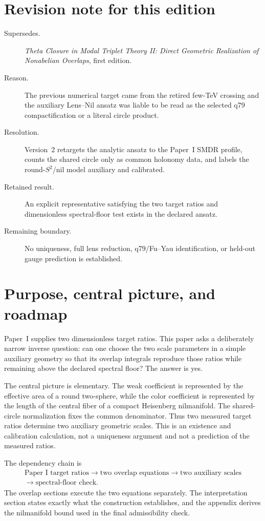 \documentclass[11pt]{article}
\begin{document}
\section*{Revision note for this edition}
\begin{description}
\item[Supersedes.] \emph{Theta Closure in Modal Triplet Theory II: Direct
Geometric Realization of Nonabelian Overlaps}, first edition.
\item[Reason.] The previous numerical target came from the retired few-TeV
crossing and the auxiliary Lens--Nil ansatz was liable to be read as the
selected q79 compactification or a literal circle product.
\item[Resolution.] Version~2 retargets the analytic ansatz to the Paper~I
SMDR profile, counts the shared circle only as common holonomy data, and labels
the round-$S^2$/nil model auxiliary and calibrated.
\item[Retained result.] An explicit representative satisfying the two target
ratios and dimensionless spectral-floor test exists in the declared ansatz.
\item[Remaining boundary.] No uniqueness, full lens reduction, q79/Fu--Yau
identification, or held-out gauge prediction is established.
\end{description}

\section{Purpose, central picture, and roadmap}

Paper~I supplies two dimensionless target ratios. This paper asks a deliberately
narrow inverse question: can one choose the two scale parameters in a simple
auxiliary geometry so that its overlap integrals reproduce those ratios while
remaining above the declared spectral floor? The answer is yes.

The central picture is elementary. The weak coefficient is
represented by the effective area of a round two-sphere, while the color
coefficient is represented by the length of the central fiber of a compact
Heisenberg nilmanifold. The shared-circle normalization fixes the common
denominator. Thus two measured target ratios determine two auxiliary geometric
scales. This is an existence and calibration calculation, not a uniqueness
argument and not a prediction of the measured ratios.

The dependency chain is
\[
\begin{gathered}
\text{Paper~I target ratios}
\longrightarrow
\text{two overlap equations}
\longrightarrow
\text{two auxiliary scales}\\
\longrightarrow
\text{spectral-floor check}.
\end{gathered}
\]
The overlap sections execute the two equations separately. The interpretation
section states exactly what the construction establishes, and the appendix derives the
nilmanifold bound used in the final admissibility check.
\end{document}
